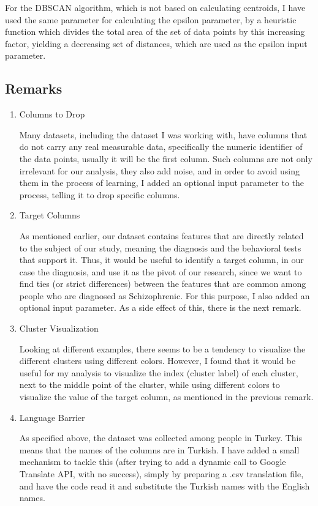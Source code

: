 \documentclass{article}
\begin{document}
For the DBSCAN algorithm, which is not based on calculating centroids, I have used the same parameter for calculating the epsilon parameter, by a heuristic function which divides the total area of the set of data points by this increasing factor, yielding a decreasing set of distances, which are used as the epsilon input parameter.

\subsection{Remarks}
\begin{enumerate}
    \item Columns to Drop

    Many datasets, including the dataset I was working with, have columns that do not carry any real measurable data, specifically the numeric identifier of the data points, usually it will be the first column. Such columns are not only irrelevant for our analysis, they also add noise, and in order to avoid using them in the process of learning, I added an optional input parameter to the process, telling it to drop specific columns.
    \item Target Columns

    As mentioned earlier, our dataset contains features that are directly related to the subject of our study, meaning the diagnosis and the behavioral tests that support it. Thus, it would be useful to identify a target column, in our case the diagnosis, and use it as the pivot of our research, since we want to find ties (or strict differences) between the features that are common among people who are diagnosed as Schizophrenic. For this purpose, I also added an optional input parameter. As a side effect of this, there is the next remark.

    \item Cluster Visualization

    Looking at different examples, there seems to be a tendency to visualize the different clusters using different colors. However, I found that it would be useful for my analysis to visualize the index (cluster label) of each cluster, next to the middle point of the cluster, while using different colors to visualize the value of the target column, as mentioned in the previous remark.

    \item Language Barrier
    
    As specified above, the dataset was collected among people in Turkey. This means that the names of the columns are in Turkish. I have added a small mechanism to tackle this (after trying to add a dynamic call to Google Translate API, with no success), simply by preparing a .csv translation file, and have the code read it and substitute the Turkish names with the English names.
\end{enumerate}
\end{document}
